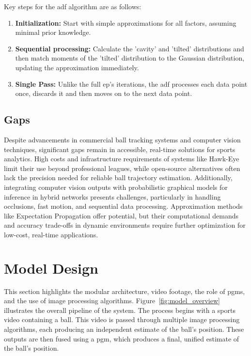 \documentclass[12pt,a4paper]{article}
\begin{document}
Key steps for the \acs{adf} algorithm are as follows:

\begin{enumerate}
	\item \textbf{Initialization:} Start with simple approximations for all factors, assuming minimal prior knowledge.
	\item \textbf{Sequential processing:} Calculate the 'cavity' and 'tilted' distributions and then match moments of the 'tilted' distribution to the Gaussian distribution, updating the approximation immediately.
	\item \textbf{Single Pass:} Unlike the full \acs{ep}'s iterations, the \acs{adf} processes each data point once, discards it and then moves on to the next data point.
\end{enumerate}

\subsection{Gaps}
Despite advancements in commercial ball tracking systems and computer vision techniques, significant gaps remain in accessible, real-time solutions for sports analytics. High costs and infrastructure requirements of systems like Hawk-Eye limit their use beyond professional leagues, while open-source alternatives often lack the precision needed for reliable ball trajectory estimation. Additionally, integrating computer vision outputs with probabilistic graphical models for inference in hybrid networks presents challenges, particularly in handling occlusions, fast motion, and sequential data processing. Approximation methods like Expectation Propagation offer potential, but their computational demands and accuracy trade-offs in dynamic environments require further optimization for low-cost, real-time applications.

\newpage
\section{Model Design}
This section highlights the modular architecture, video footage, the role of \acp{pgm}, and the use of image processing algorithms. Figure~\ref{fig:model_overview} illustrates the overall pipeline of the system. The process begins with a sports video containing a ball. This video is passed through multiple image processing algorithms, each producing an independent estimate of the ball’s position. These outputs are then fused using a \acs{pgm}, which produces a final, unified estimate of the ball’s position.
\end{document}

